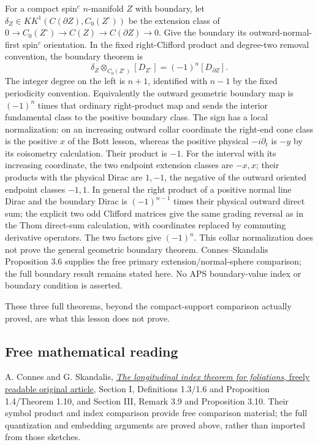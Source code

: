 \documentclass[
  11pt,
]{article}
\begin{document}
For a compact spin\(^{c}\) \(n\)-manifold \(Z\) with boundary, let
\(\delta_Z\in KK^1(C(\partial Z),C_0(Z^\circ))\) be the extension class
of \(0\to C_0(Z^\circ)\to C(Z)\to C(\partial Z)\to0\). Give the boundary
its outward-normal-first spin\(^{c}\) orientation. In the fixed
right-Clifford product and degree-two removal convention, the boundary
theorem is \[
 \delta_Z\otimes_{C_0(Z^\circ)}[D_{Z^\circ}]
          =(-1)^n[D_{\partial Z}].
\] The integer degree on the left is \(n+1\), identified with \(n-1\) by
the fixed periodicity convention. Equivalently the outward geometric
boundary map is \((-1)^n\) times that ordinary right-product map and
sends the interior fundamental class to the positive boundary class. The
sign has a local normalization: on an increasing outward collar
coordinate the right-end cone class is the positive \(x\) of the Bott
lesson, whereas the positive physical \(-i\partial_t\) is \(-y\) by its
coisometry calculation. Their product is \(-1\). For the interval with
its increasing coordinate, the two endpoint extension classes are
\(-x,x\); their products with the physical Dirac are \(1,-1\), the
negative of the outward oriented endpoint classes \(-1,1\). In general
the right product of a positive normal line Dirac and the boundary Dirac
is \((-1)^{n-1}\) times their physical outward direct sum; the explicit
two odd Clifford matrices give the same grading reversal as in the Thom
direct-sum calculation, with coordinates replaced by commuting
derivative operators. The two factors give \((-1)^n\). This collar
normalization does not prove the general geometric boundary theorem.
Connes--Skandalis Proposition 3.6 supplies the free primary
extension/normal-sphere comparison; the full boundary result remains
stated here. No APS boundary-value index or boundary condition is
asserted.

These three full theorems, beyond the compact-support comparison
actually proved, are what this lesson does not prove.

\subsection{Free mathematical reading}\label{free-mathematical-reading}

A. Connes and G. Skandalis,
\href{https://ems.press/content/serial-article-files/42241}{\emph{The
longitudinal index theorem for foliations}, freely readable original
article}, Section I, Definitions 1.3/1.6 and Proposition 1.4/Theorem
1.10, and Section III, Remark 3.9 and Proposition 3.10. Their symbol
product and index comparison provide free comparison material; the full
quantization and embedding arguments are proved above, rather than
imported from those sketches.
\end{document}
